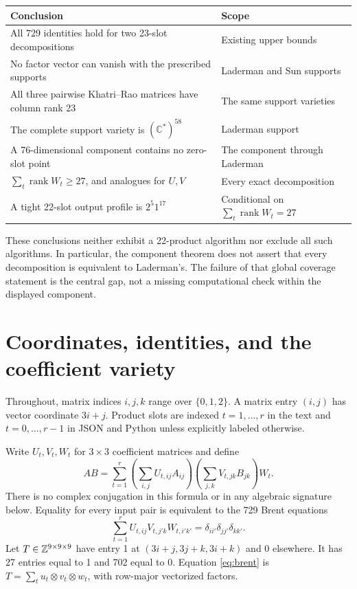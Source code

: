 \documentclass[11pt,letterpaper]{article}
\theoremstyle{definition}\newtheorem{definition}[theorem]{Definition}
\theoremstyle{remark}\newtheorem{remark}[theorem]{Remark}
\newcommand{\Cstar}{\mathbb C^{\!*}}
\DeclareMathOperator{\rank}{rank}\DeclareMathOperator{\tr}{tr}
\begin{document}
\begin{center}
\begin{tabular}{p{}p{}}
\toprule
Conclusion & Scope \\
\midrule
All 729 identities hold for two 23-slot decompositions & Existing upper bounds \\
No factor vector can vanish with the prescribed supports & Laderman and Sun supports \\
All three pairwise Khatri--Rao matrices have column rank 23 & The same support varieties \\
The complete support variety is $(\Cstar)^{58}$ & Laderman support \\
A 76-dimensional component contains no zero-slot point & The component through Laderman \\
$\sum_t\rank W_t\ge27$, and analogues for $U,V$ & Every exact decomposition \\
A tight 22-slot output profile is $2^5 1^{17}$ & Conditional on $\sum_t\rank W_t=27$ \\
\bottomrule
\end{tabular}
\end{center}

These conclusions neither exhibit a 22-product algorithm nor exclude all
such algorithms. In particular, the component theorem does not assert that
every decomposition is equivalent to Laderman's. The failure of that global
coverage statement is the central gap, not a missing computational check
within the displayed component.

\section{Coordinates, identities, and the coefficient variety}
\label{sec:coordinates}
Throughout, matrix indices $i,j,k$ range over $\{0,1,2\}$. A matrix entry
$(i,j)$ has vector coordinate $3i+j$. Product slots are indexed
$t=1,\ldots,r$ in the text and $t=0,\ldots,r-1$ in JSON and Python unless
explicitly labeled otherwise.

Write $U_t,V_t,W_t$ for $3\times3$ coefficient matrices and define
\begin{equation}\label{eq:algorithm}
AB=\sum_{t=1}^r
 \left(\sum_{i,j}U_{t,ij}A_{ij}\right)
 \left(\sum_{j,k}V_{t,jk}B_{jk}\right)W_t.
\end{equation}
There is no complex conjugation in this formula or in any algebraic
signature below. Equality for every input pair is equivalent to the 729
Brent equations
\begin{equation}\label{eq:brent}
\sum_{t=1}^r U_{t,ij}V_{t,j'k}W_{t,i'k'}
  =\delta_{ii'}\delta_{jj'}\delta_{kk'}.
\end{equation}
Let $T\in\mathbb Z^{9\times9\times9}$ have entry 1 at
$(3i+j,3j+k,3i+k)$ and 0 elsewhere. It has 27 entries equal to 1 and 702
equal to 0. Equation \eqref{eq:brent} is
$T=\sum_t u_t\otimes v_t\otimes w_t$, with row-major vectorized factors.
\end{document}
